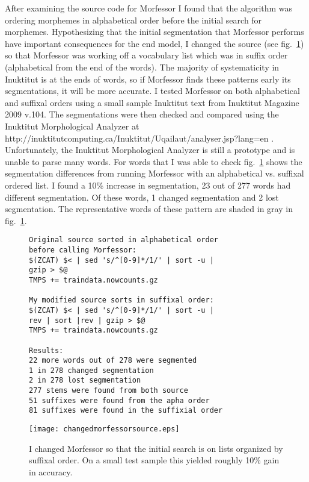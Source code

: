 \documentclass[runningheads,a4paper]{llncs}
\begin{document}
After examining the source code for Morfessor I found that the algorithm was ordering morphemes in alphabetical order before the initial search for morphemes. Hypothesizing that the initial segmentation that Morfessor performs have important consequences for the end model, I changed the source (see fig.~\ref{fig:changemorfessorsource}) so that Morfessor was working off a vocabulary list which was in suffix order (alphabetical from the end of the words). The majority of systematicity in Inuktitut is at the ends of words, so if Morfessor finds these patterns early its segmentations, it will be more accurate. I tested Morfessor on both alphabetical and suffixal orders using a small sample Inuktitut text from Inuktitut Magazine 2009 v.104. The segmentations were then checked and compared using the Inuktitut Morphological Analyzer at http://inuktitutcomputing.ca/Inuktitut/Uqailaut/analyser.jsp?lang=en . Unfortunately, the Inuktitut Morphological Analyzer is still a prototype and is unable to parse many words. For words that I was able to check fig.~\ref{fig:changemorfessorsource} shows the segmentation differences from running Morfessor with an alphabetical vs. suffixal ordered list. I found a 10\% increase in segmentation, 23 out of 277 words had different segmentation. Of these words, 1 changed segmentation and 2 lost segmentation. The representative words of these pattern are shaded in gray in fig.~\ref{fig:changemorfessorsource}.


\begin{figure}[htb]	
	\begin{verbatim}
Original source sorted in alphabetical order 
before calling Morfessor:
$(ZCAT) $< | sed 's/^[0-9]*/1/' | sort -u | 
gzip > $@
TMPS += traindata.nowcounts.gz

My modified source sorts in suffixal order:
$(ZCAT) $< | sed 's/^[0-9]*/1/' | sort -u | 
rev | sort |rev | gzip > $@
TMPS += traindata.nowcounts.gz

Results:
22 more words out of 278 were segmented 
1 in 278 changed segmentation
2 in 278 lost segmentation
277 stems were found from both source	
51 suffixes were found from the apha order
81 suffixes were found in the suffixial order	
\end{verbatim}
\hspace{-0.3in}\texttt{[image: changedmorfessorsource.eps]}
	\caption{I changed Morfessor so that the initial search is on lists organized by suffixal order. On a small test sample this yielded roughly 10\% gain in accuracy.}
	\label{fig:changemorfessorsource}
\end{figure}
\end{document}
